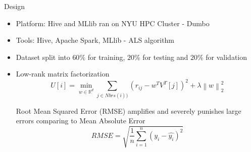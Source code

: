 \documentclass{beamer}
\begin{document}

\begin{frame}{Design}{}

    \begin{itemize}
        \item {Platform: Hive and MLlib ran on NYU HPC Cluster - Dumbo}
     
        \item{Tools: Hive, Apache Spark, MLlib - ALS algorithm}
        
        \item{Dataset split into $60\%$ for training, $20\%$ for testing and $20\%$ for validation}
        
        \item {
            
            Low-rank matrix factorization 
            $$U[i] = \min_{w \in \mathbb{R}^d} \sum_{j \in Nbrs(i))} (r_{ij} - w^TV^T[j])^2 + \lambda \left \| w \right \|^2_2$$
            
            Root Mean Squared Error (RMSE) amplifies and severely punishes large errors comparing to Mean Absolute Error
            $$RMSE = \sqrt{\frac{1}{n} \sum_{i=1}^{n}(y_i - \hat{y_i})^2}$$
            
        }
    \end{itemize}
 
\end{frame}


\end{document}

